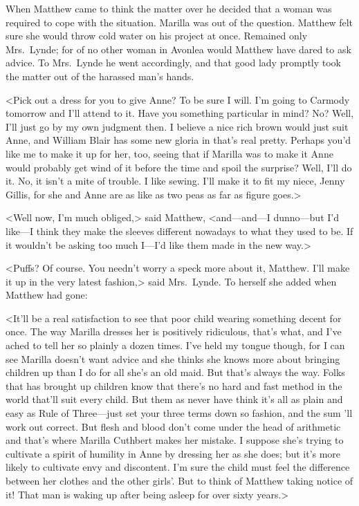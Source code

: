 When Matthew came to think the matter over he decided that a woman was required to cope with the situation. Marilla was out of the question. Matthew felt sure she would throw cold water on his project at once. Remained only Mrs.~Lynde; for of no other woman in Avonlea would Matthew have dared to ask advice. To Mrs.~Lynde he went accordingly, and that good lady promptly took the matter out of the harassed man's hands.

<Pick out a dress for you to give Anne? To be sure I will. I'm going to Carmody tomorrow and I'll attend to it. Have you something particular in mind? No? Well, I'll just go by my own judgment then. I believe a nice rich brown would just suit Anne, and William Blair has some new gloria in that's real pretty. Perhaps you'd like me to make it up for her, too, seeing that if Marilla was to make it Anne would probably get wind of it before the time and spoil the surprise? Well, I'll do it. No, it isn't a mite of trouble. I like sewing. I'll make it to fit my niece, Jenny Gillis, for she and Anne are as like as two peas as far as figure goes.>

<Well now, I'm much obliged,> said Matthew, <and—and—I dunno—but I'd like—I think they make the sleeves different nowadays to what they used to be. If it wouldn't be asking too much I—I'd like them made in the new way.>

<Puffs? Of course. You needn't worry a speck more about it, Matthew. I'll make it up in the very latest fashion,> said Mrs.~Lynde. To herself she added when Matthew had gone:

<It'll be a real satisfaction to see that poor child wearing something decent for once. The way Marilla dresses her is positively ridiculous, that's what, and I've ached to tell her so plainly a dozen times. I've held my tongue though, for I can see Marilla doesn't want advice and she thinks she knows more about bringing children up than I do for all she's an old maid. But that's always the way. Folks that has brought up children know that there's no hard and fast method in the world that'll suit every child. But them as never have think it's all as plain and easy as Rule of Three—just set your three terms down so fashion, and the sum 'll work out correct. But flesh and blood don't come under the head of arithmetic and that's where Marilla Cuthbert makes her mistake. I suppose she's trying to cultivate a spirit of humility in Anne by dressing her as she does; but it's more likely to cultivate envy and discontent. I'm sure the child must feel the difference between her clothes and the other girls'. But to think of Matthew taking notice of it! That man is waking up after being asleep for over sixty years.>


